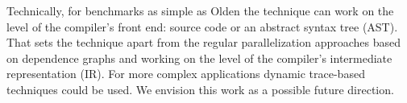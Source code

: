\quad Technically, for benchmarks as simple as Olden the technique can work on the level of the compiler's front end: source code or an abstract syntax tree (AST). That sets the technique apart from the regular parallelization approaches based on dependence graphs and working on the level of the compiler's intermediate representation (IR). For more complex applications dynamic trace-based techniques could be used.\newline\null
\quad We envision this work as a possible future direction.

